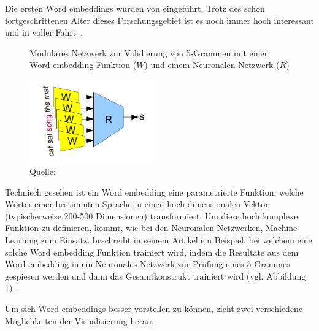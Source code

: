 Die ersten Word embeddings wurden von \textcite{Bengio2001} eingeführt. Trotz des schon fortgeschrittenen Alter dieses Forschungsgebiet ist es noch immer hoch interessant und in voller Fahrt~\autocite{Olah2014b}.

\begin{figure} 
    \captionsetup{width=.9\linewidth}
    \caption[Modulares Netzwerk zur Validierung von 5-Grammen]{Modulares Netzwerk zur Validierung von 5-Grammen mit einer Word embedding Funktion ($W$) und einem Neuronalen Netzwerk ($R$)}
    \label{wordembeddingtraining}
    \centering
    \includegraphics[width=0.48\textwidth]{graphics/wordembeddingtraining.png}
    \caption*{Quelle: \textcite{Olah2014b}}
\end{figure}
Technisch gesehen ist ein Word embedding eine parametrierte Funktion, welche Wörter einer bestimmten Sprache in einen hoch-dimensionalen Vektor (typischerweise 200-500 Dimensionen) transformiert. Um diese hoch komplexe Funktion zu definieren, kommt, wie bei den Neuronalen Netzwerken, Machine Learning zum Einsatz. \textcite{Olah2014b} beschreibt in seinem Artikel ein Beispiel, bei welchem eine solche Word embedding Funktion trainiert wird, indem die Resultate aus dem Word embedding in ein Neuronales Netzwerk zur Prüfung eines 5-Grammes gespiesen werden und dann das Gesamtkonstrukt trainiert wird (vgl. Abbildung \ref{wordembeddingtraining})~\autocite{Olah2014b}.

Um sich Word embeddings besser vorstellen zu können, zieht \textcite{Olah2014b} zwei verschiedene Möglichkeiten der Visualisierung heran.

